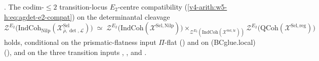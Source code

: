 \begin{theorem}
\label{v4-arith:w6-g:thm:agdet-transition-closure}
\ClaimStatusProvedHereConditional. The codim-\(\leq 2\) transition-locus
\(E_{2}\)-centre compatibility
(\ref{v4-arith:w5-h:eq:agdet-e2-compat})
on the determinantal cleavage
\begin{equation}
\label{v4-arith:w6-g:eq:agdet-transition-compat}
\mathcal{Z}^{E_{2}}\bigl(\mathrm{IndCoh}_{\mathrm{Nilp}}(\mathcal{X}^{\mathrm{Sel}}_{\bar\rho,\det,\mathcal{L}})\bigr)
\;\simeq\;
\mathcal{Z}^{E_{2}}\bigl(\mathrm{IndCoh}(\mathcal{X}^{\mathrm{Sel},\mathrm{Nilp}})\bigr)
\times_{\mathcal{Z}^{E_{2}}(\mathrm{IndCoh}(\mathcal{X}^{\mathrm{Sel},\mathrm{tr}}))}
\mathcal{Z}^{E_{2}}\bigl(\mathrm{QCoh}(\mathcal{X}^{\mathrm{Sel},\mathrm{reg}})\bigr)
\end{equation}
holds, conditional on the prismatic-flatness input \(\Pi\)-flat
() and on
(BCglue.local) (),
and on the three transition inputs
,
, and
.
\end{theorem}

